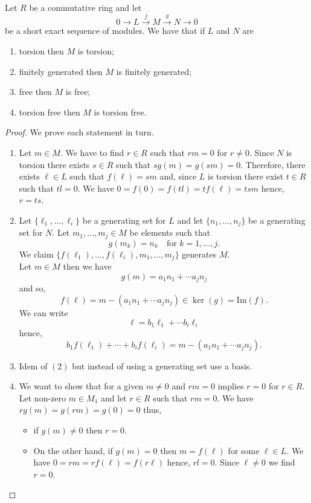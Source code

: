 \documentclass[12pt, a4paper]{article}
\begin{document}
\begin{mdprop}\label{short exact preserve}
    Let \(R\) be a commutative ring and let 
    \[0 \to L \xrightarrow{f} M \xrightarrow{g} N \to 0\]
    be a short exact sequence of modules. We have that if \(L\) and \(N\) are 
    \begin{enumerate}
        \item torsion then \(M\) is torsion;
        \item finitely generated then \(M\) is finitely generated;
        \item free then \(M\) is free;
        \item torsion free then \(M\) is torsion free.
    \end{enumerate}
\end{mdprop}

\begin{proof}
    We prove each statement in turn.
    \begin{enumerate}
        \item Let \(m\in M\). We have to find \(r\in R\) such that \(rm=0\) for \(r\neq 0\). Since \(N\) is torsion there exists \(s\in R\) such that \(sg(m) = g(sm)=0\). Therefore, there exists \(\ell \in L\) such that \(f(\ell)=sm\) and, since \(L\) is torsion there exist \(t\in R\) such that \(tl=0\). We have \(0=f(0)=f(tl)=tf(\ell)=tsm\) hence, \(r=ts\).
        \item Let \(\{\ell_1,\ldots,\ell_i\}\) be a generating set for \(L\) and let \(\{n_1,\ldots,n_j\}\) be a generating set for \(N\). Let \(m_1,\ldots,m_j \in M\)  be elements such that 
        \[g(m_k)=n_k \quad \text{for } k=1,\ldots,j.\]
        We claim \(\{f(\ell_1),\ldots,f(\ell_i),m_1,\ldots,m_j\}\) generates \(M\).\\
        Let \(m\in M\) then we have 
        \[g(m)=a_1n_1+\cdots a_jn_j\]
        and so, 
        \[f(\ell)=m-\left( a_1n_1+\cdots a_jn_j \right) \in \ker(g)=\text{Im}(f).\]
        We can write
        \[\ell=b_1\ell_1+\cdots b_i\ell_i\]
        hence,
        \[b_1f(\ell_1)+\cdots+b_if(\ell_i)=m-\left( a_1n_1+\cdots a_jn_j \right).\]
        \item Idem of \((2)\) but instead of using a generating set use a basis.
        \item We want to show that for a given \(m\neq 0\) and \(rm=0\) implies \(r=0\) for \(r\in R\). \\
        Let non-zero \(m\in M_1\) and let \(r\in R\) such that \(rm=0\). We have \(rg(m)=g(rm)=g(0)=0\) thus,
        \begin{itemize}
            \item if \(g(m) \neq 0\) then \(r=0\).
            \item On the other hand, if \(g(m)=0\) then \(m=f(\ell)\) for some \(\ell \in L\). We have \(0=rm=rf(\ell)=f(r\ell)\) hence, \(rl=0\). Since \(\ell\neq 0\) we find \(r=0\).
        \end{itemize}
    \end{enumerate}
\end{proof}
\end{document}
